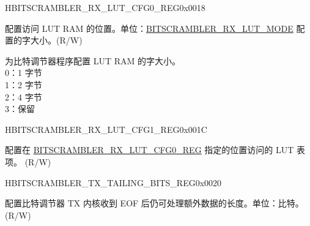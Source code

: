 \begin{register}{H}{BITSCRAMBLER\_RX\_LUT\_CFG0\_REG}{0x0018}\label{regdesc:BITSCRAMBLERRXLUTCFG0REG}
%
%
%
\regnewline%
\begin{regdesc}\begin{reglist}
\label{fielddesc:BITSCRAMBLERRXLUTIDX}\item [BITSCRAMBLER\_RX\_LUT\_IDX] 配置访问 LUT RAM 的位置。单位：\hyperref[fielddesc:BITSCRAMBLERRXLUTMODE]{BITSCRAMBLER\_RX\_LUT\_MODE} 配置的字大小。(R/W)
\label{fielddesc:BITSCRAMBLERRXLUTMODE}\item [BITSCRAMBLER\_RX\_LUT\_MODE] 为比特调节器程序配置 LUT RAM 的字大小。 \\
0：1 字节\\
1：2 字节\\
2：4 字节\\
3：保留 \\
\end{reglist}\end{regdesc}
\end{register}


\begin{register}{H}{BITSCRAMBLER\_RX\_LUT\_CFG1\_REG}{0x001C}\label{regdesc:BITSCRAMBLERRXLUTCFG1REG}
%
\regnewline%
\begin{regdesc}\begin{reglist}
\label{fielddesc:BITSCRAMBLERRXLUT}\item [BITSCRAMBLER\_RX\_LUT] 配置在  \hyperref[regdesc:BITSCRAMBLERRXLUTCFG0REG]{BITSCRAMBLER\_RX\_LUT\_CFG0\_REG} 指定的位置访问的 LUT 表项。 (R/W)
\end{reglist}\end{regdesc}
\end{register}


\begin{register}{H}{BITSCRAMBLER\_TX\_TAILING\_BITS\_REG}{0x0020}\label{regdesc:BITSCRAMBLERTXTAILINGBITSREG}
%
%
\regnewline%
\begin{regdesc}\begin{reglist}
\label{fielddesc:BITSCRAMBLERTXTAILINGBITS}\item [BITSCRAMBLER\_TX\_TAILING\_BITS]配置比特调节器 TX 内核收到 EOF 后仍可处理额外数据的长度。单位：比特。 (R/W)
\end{reglist}\end{regdesc}
\end{register}


